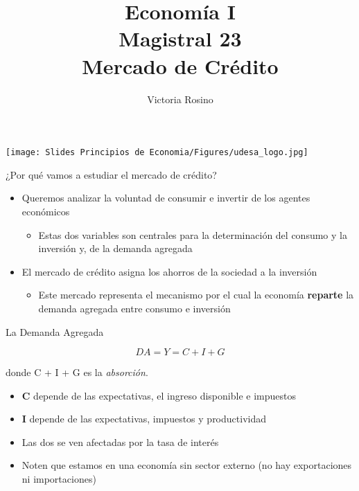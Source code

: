 \documentclass{beamer}
\title[Economía I]{Economía I \vspace{3mm}
\\ Magistral 23 \vspace{3mm} \\ Mercado de Crédito}
\date{}
\author[Victoria Rosino]{Victoria Rosino}
\institute[]{Universidad de San Andrés}
\begin{document}
\begin{frame}
\vspace{0.3cm}
\titlepage
\centering
\vspace{-0.9cm}
\texttt{[image: Slides Principios de Economia/Figures/udesa\_logo.jpg]} 
\end{frame}


\begin{frame}{¿Por qué vamos a estudiar el mercado de crédito?}
    \begin{itemize}
        \item Queremos analizar la voluntad de consumir e invertir de los agentes económicos \vspace{1mm}
        \begin{itemize}
            \item Estas dos variables son centrales para la determinación del consumo y la inversión y, de la demanda agregada
        \end{itemize}
        \vspace{2mm}
        \item El mercado de crédito asigna los ahorros de la sociedad a la inversión \vspace{1mm}
        \begin{itemize}
            \item Este mercado representa el mecanismo por el cual la economía \textbf{reparte} la demanda agregada entre consumo e inversión
        \end{itemize}
    \end{itemize}
\end{frame}

\begin{frame}{La Demanda Agregada}
\begin{center}
   \begin{tcolorbox}[width=3in,
                  boxsep=0pt,
                  left=0pt,
                  right=0pt,
                  top=2pt,
                  colframe = blue!70!black,,
                    colback = blue!7!white,
                  ]%
        $$ DA=Y = C + I + G $$
    \end{tcolorbox} 
\end{center}
\vspace{1cm}
donde C + I + G es la \textit{absorción}.

\begin{itemize}
        \item \textbf{C} depende de las expectativas, el ingreso disponible e impuestos
        \item \textbf{I} depende de las expectativas, impuestos y productividad
        \item Las dos se ven afectadas por la tasa de interés
        \item Noten que estamos en una economía sin sector externo (no hay exportaciones ni importaciones)
\end{itemize}
\end{frame}
\end{document}
